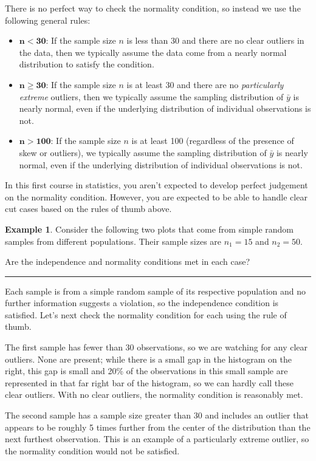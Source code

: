 \documentclass[
  10pt,
  openany]{book}
\providecommand{\tightlist}{%
  \setlength{\itemsep}{0pt}\setlength{\parskip}{0pt}}
\theoremstyle{definition}
\theoremstyle{definition}
\newtheorem{example}{Example}[chapter]
\theoremstyle{definition}
\theoremstyle{definition}
\theoremstyle{remark}
\begin{document}
There is no perfect way to check the normality condition,
so instead we use the following general rules:

\begin{itemize}
\tightlist
\item
  \(\mathbf{n < 30}\): If the sample size \(n\) is less than 30
  and there are no clear outliers in the data,
  then we typically assume the data come from
  a nearly normal distribution to satisfy the
  condition.\\
\item
  \(\mathbf{n \geq 30}\): If the sample size \(n\) is at least 30
  and there are no \emph{particularly extreme} outliers,
  then we typically assume the sampling distribution
  of \(\bar{y}\) is nearly normal, even if the underlying
  distribution of individual observations is not.
\item
  \(\mathbf{n > 100}\): If the sample size \(n\) is at least 100
  (regardless of the presence of skew or outliers),
  we typically assume the sampling distribution
  of \(\bar{y}\) is nearly normal, even if the underlying
  distribution of individual observations is not.
\end{itemize}

In this first course in statistics, you aren't expected
to develop perfect judgement on the normality condition.
However, you are expected to be able to handle
clear cut cases based on the rules of thumb above.

\begin{example}
Consider the following two plots
that come from simple random samples from
different populations.
Their sample sizes are \(n_1 = 15\) and \(n_2 = 50\).

Are the independence and normality conditions met
in each case?

\begin{center}\rule{0.5\linewidth}{0.5pt}\end{center}

Each sample is from a simple random sample of its
respective population and no further information suggests a violation, so the independence condition
is satisfied.
Let's next check the normality condition for
each using the rule of thumb.

The first sample has fewer than 30 observations,
so we are watching for any clear outliers.
None are present; while there is a small gap in the
histogram on the right, this gap is small and
20\% of the observations in this small sample
are represented in that far right bar of the histogram,
so we can hardly call these clear outliers.
With no clear outliers, the normality condition
is reasonably met.

The second sample has a sample size greater than 30 and
includes an outlier that appears to be roughly 5 times
further from the center of the distribution than the
next furthest observation.
This is an example of a particularly extreme outlier,
so the normality condition would not be satisfied.
\end{example}
\end{document}
